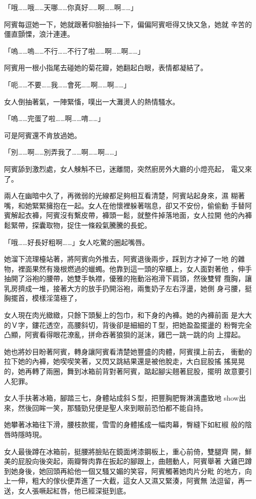 「哦……哦……天哪……你真好……啊……啊……」

阿賓每逗她一下，她就跟著仰臉抽抖一下，偏偏阿賓咂得又快又急，她就
辛苦的僵直顫慄，浪汁連連。

「嗚……嗚……不行……不行了啦……啊……啊……」

阿賓用一根小指尾去碰她的菊花瓣，她翻起白眼，表情都凝結了。

「呃……不要……我……會死……啊……啊……」

女人倒抽著氣，一陣緊慉，噗出一大灘燙人的熱情騷水。

「嗚……完蛋了啦……啊……唷……」

可是阿賓還不肯放過她。

「別……啊……別弄我了……啊……啊……」

阿賓舔到激烈處，女人觫斛不已，迷離間，突然廚房外大廳的小燈亮起，
電又來了。

兩人在幽暗中久了，再微弱的光線都足夠相互看清楚，阿賓站起身來，濕
糊著嘴，和她緊緊擁抱在一起。女人在他懷裡躲著喘息，卻又不安份，偷偷動
手替阿賓解起衣褲，阿賓沒有繫皮帶，褲頭一鬆，就整件掉落地面，女人拉開
他的內褲鬆緊帶，探囊取物，捉住一條殺氣騰騰的長蛇。

「哦……好長好粗啊……」女人吃驚的圈起嘴唇。

她溜下流理檯站著，將阿賓向外推去，阿賓退後兩步，踩到方才掉了一地
的雜物，裡面果然有幾根燃過的蠟蠋。他靠到這一頭的窄櫃上，女人面對著他
，伸手抽開了浴袍的腰帶，她雙手執襟，優雅的拖動浴袍滑下肩頭，然後雙臂
攬胸，讓乳房擠成一堆，接著大方的放手扔開浴袍，兩隻奶子左右浮盪，她側
身弓腰，挺胸擺首，模樣淫蕩極了，

女人現在肉光緻緻，只餘下頭髮上的包巾，和下身的內褲。她的內褲前面
是大大的Ｖ字，鏤花透空，高腰斜切，背後卻是細細的Ｔ型，把她盈盈擺盪的
粉臀完全凸顯，阿賓看得眼花潦亂，拼命吞著狼狽的涎沫，雞巴一跳一跳的向
上撐起。

她也將妙目盼著阿賓，轉身讓阿賓看清楚她豐盛的肉體，阿賓撲上前去，
衝動的拉下她的內褲，她喫喫笑著，又閃又跳結果還是被他脫走，大白屁股搖
搖晃晃的，她再轉了兩圈，舞到冰箱前背對著阿賓，踮起腳尖翹著屁股，擺明
故意要引人犯罪。

女人手扶著冰箱，腳踏三七，身體站成斜Ｓ型，把豐胸肥臀淋漓盡致地
show出來，然後回眸一笑，那騷勁兒便是聖人來到眼前恐怕都不能自持。

她攀著冰箱往下滑，腰枝款擺，雪雪的身體搖成一幅肉幕，臀縫下如紅椒
般的陰唇時隱時現。

女人最後蹲在冰箱前，挺腰將臉貼在鏡面烤漆鋼板上，重心前倚，雙腿齊
開，鮮美的屁股向後突起，兩瓣臀肉靠在扳起的腳跟上，曲翹動人，阿賓舉著
大雞巴蹲到她身後，她回頭再給他一個又騷又媚的笑容，阿賓觸著她肉片分毗
的地方，向上一伸，粗大的傢伙便弄進了一大截，這女人又濕又緊湊，阿賓無
法逗留，再一送，女人張噘起紅唇，他已經深挺到底。

